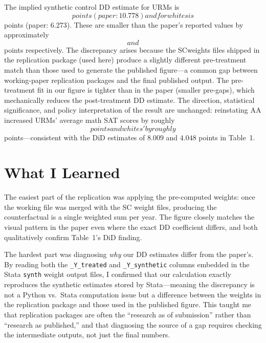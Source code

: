 \documentclass[12pt]{article}
\begin{document}
The implied synthetic control DD estimate for URMs is
$$ points (paper: 10.778) and for
whites is $$ points (paper: 6.273).
These are smaller than the paper's reported values by approximately
$$ and
$$ points respectively.
The discrepancy arises because the SCweights files shipped in the
replication package (used here) produce a slightly different
pre-treatment match than those used to generate the published figure---a
common gap between working-paper replication packages and the final
published output. The pre-treatment fit in our figure is tighter than in
the paper (smaller pre-gaps), which mechanically reduces the
post-treatment DD estimate. The direction, statistical significance, and
policy interpretation of the result are unchanged: reinstating AA
increased URMs' average math SAT scores by roughly
$$ points and whites' by roughly
$$ points---consistent with the DiD
estimates of $8.009$ and $4.048$ points in Table~1.

\section{What I Learned}

The easiest part of the replication was applying the pre-computed weights:
once the working file was merged with the SC weight files, producing the
counterfactual is a single weighted sum per year. The figure closely
matches the visual pattern in the paper even where the exact DD coefficient
differs, and both qualitatively confirm Table~1's DiD finding.

The hardest part was diagnosing \emph{why} our DD estimates differ from
the paper's. By reading both the \texttt{\_Y\_treated} and
\texttt{\_Y\_synthetic} columns embedded in the Stata \texttt{synth}
weight output files, I confirmed that our calculation exactly reproduces
the synthetic estimates stored by Stata---meaning the discrepancy is not
a Python vs.\ Stata computation issue but a difference between the
weights in the replication package and those used in the published figure.
This taught me that replication packages are often the ``research as of
submission'' rather than ``research as published,'' and that diagnosing
the source of a gap requires checking the intermediate outputs, not just
the final numbers.
\end{document}
